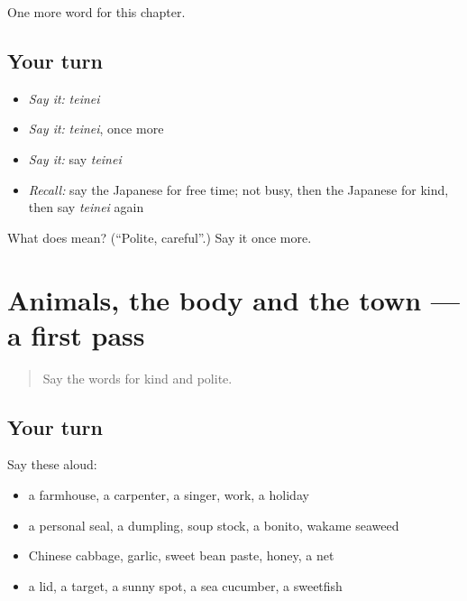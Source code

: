 \begin{grammarlens}[title={What you've built}]
One more word for this chapter.
\end{grammarlens}

\subsection*{Your turn}
\begin{itemize}
\raggedright
  \item \emph{Say it:} \emph{teinei}
  \item \emph{Say it:} \emph{teinei}, once more
  \item \emph{Say it:} say \emph{teinei}
  \item \emph{Recall:} say the Japanese for free time; not busy, then the Japanese for kind, then say \emph{teinei} again
\end{itemize}

\begin{tcolorbox}[breakable,colback=teal!4,colframe=teal!35!black,title={Before you move on}]
What does  mean? (\textquotedblleft{}Polite, careful\textquotedblright{}.) Say it once more.
\end{tcolorbox}
\section[(dialogue)]{Animals, the body and the town — a first pass}

\label{lesson:JA-R120-first-pass-animals-the-body-and-the-town}



\begin{quote}
Say the words for kind and polite.
\end{quote}

\subsection*{Your turn}
Say these aloud:

\begin{itemize}
\raggedright
  \item a farmhouse, a carpenter, a singer, work, a holiday
  \item a personal seal, a dumpling, soup stock, a bonito, wakame seaweed
  \item Chinese cabbage, garlic, sweet bean paste, honey, a net
  \item a lid, a target, a sunny spot, a sea cucumber, a sweetfish
\end{itemize}

